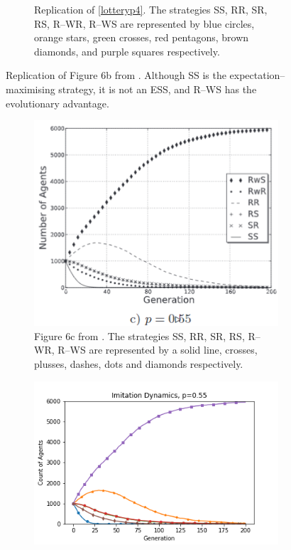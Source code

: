\begin{figure}[!h]
\begin{subfigure}[b]{0.45\textwidth}
    \caption{Replication of \ref{lotteryp4}. The strategies SS, RR, SR, RS, R--WR, R--WS are represented by blue circles, orange stars, green crosses, red pentagons, brown diamonds, and purple squares respectively. }
    \label{lotteryp4_me}
  \end{subfigure}
  \caption{Replication of Figure 6b from \cite{RN30}. Although SS is the expectation--maximising strategy, it is not an ESS, and R--WS has the evolutionary advantage.} \label{lottery_comp4}
\end{figure} 
\FloatBarrier

 \FloatBarrier 
\begin{figure}[!h]
  \begin{subfigure}[b]{0.45\textwidth}
    \includegraphics[width=\textwidth]{images/lotteryp055.png}
    \caption{Figure 6c from \cite{RN30}. The strategies SS, RR, SR, RS, R--WR, R--WS are represented by a solid line, crosses, plusses, dashes, dots and diamonds respectively.}
    \label{lotteryp055}
  \end{subfigure}
  \hfill
  \begin{subfigure}[b]{0.45\textwidth}
    \includegraphics[width=1.25\textwidth]{images/lotteryp055_me.png}

\end{subfigure}
\end{figure}
